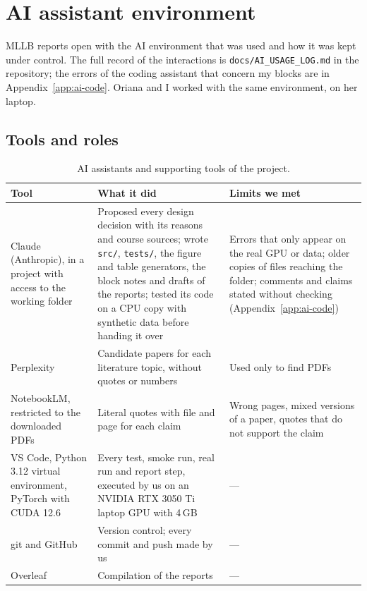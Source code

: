 \section{AI assistant environment}\label{sec:ai-env}

MLLB reports open with the AI environment that was used and how it was kept under control. The full record
of the interactions is \texttt{docs/AI\_USAGE\_LOG.md} in the repository; the errors of the coding
assistant that concern my blocks are in Appendix~\ref{app:ai-code}. Oriana and I worked with the same
environment, on her laptop.

\subsection{Tools and roles}

\begin{table}[htbp]
\centering
\caption{AI assistants and supporting tools of the project.}
\label{tab:ai-tools}
\small
\begin{tabularx}{\textwidth}{>{\raggedright\arraybackslash}p{3.3cm} >{\raggedright\arraybackslash}X >{\raggedright\arraybackslash}X}
\toprule
\textbf{Tool} & \textbf{What it did} & \textbf{Limits we met} \\
\midrule
Claude (Anthropic), in a project with access to the working folder & Proposed every design decision with its
reasons and course sources; wrote \texttt{src/}, \texttt{tests/}, the figure and table generators, the block
notes and drafts of the reports; tested its code on a CPU copy with synthetic data before handing it over &
Errors that only appear on the real GPU or data; older copies of files reaching the folder; comments and
claims stated without checking (Appendix~\ref{app:ai-code}) \\
Perplexity & Candidate papers for each literature topic, without quotes or numbers & Used only to find
PDFs \\
NotebookLM, restricted to the downloaded PDFs & Literal quotes with file and page for each claim & Wrong
pages, mixed versions of a paper, quotes that do not support the claim \\
\midrule
VS Code, Python 3.12 virtual environment, PyTorch with CUDA 12.6 & Every test, smoke run, real run and report
step, executed by us on an NVIDIA RTX 3050 Ti laptop GPU with 4\,GB & --- \\
git and GitHub & Version control; every commit and push made by us & --- \\
Overleaf & Compilation of the reports & --- \\
\bottomrule
\end{tabularx}
\end{table}

